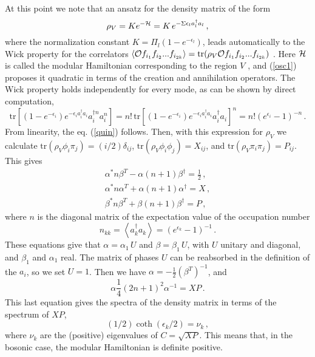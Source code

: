\documentclass[11pt]{article}
\begin{document}
At this point we note that an ansatz for the density matrix of the form \cite{peschel,chung}
\begin{equation}
\rho _{V}=K e^{-{\cal H}}=K\,e^{-\Sigma \epsilon _{l}a_{l}^{\dagger }a_{l}}\,,  \label{osc1}
\end{equation}
where  the normalization constant $K=\Pi_l (1-e^{-\epsilon_l} )$, leads automatically to the Wick property for the correlators  
$\left<{\cal O} f_{i_1} f_{i_2}...f_{i_{2k}}\right>=\textrm{tr}(\rho _{V}  {\cal O} f_{i_1} f_{i_2}...f_{i_{2k}})$ \cite{wick}. Here ${\cal H}$ is called the modular Hamiltonian corresponding to the region $V$ \cite{haag}, and (\ref{osc1}) proposes it quadratic in terms of the creation and annihilation operators. 
 The Wick property holds independently for every mode, as can be shown by direct computation,
\begin{equation}
\textrm{tr} \left[(1-e^{-\epsilon_i} ) e^{-\epsilon_i a^\dagger_i a_i}      a_i^{\dagger n}   a_i^n   \right]=n!\,\textrm{tr}\left[(1-e^{-\epsilon_i} ) e^{-\epsilon_i a^\dagger_i a_i}  a_i^{\dagger} a_i   \right]^n= n! (e^{\epsilon_i} -1)^{-n}\,.
\end{equation}
From linearity, the eq. (\ref{quin}) follows.    
Then, with this expression for $\rho_V$ we calculate $\textrm{tr} (\rho_V \phi_i\pi_j)=(i/2)\delta_{ij}$, $\textrm{tr} (\rho_V \phi_i\phi_j)=X_{ij}$, and $\textrm{tr} (\rho_V \pi_i\pi_j)= P_{ij}$. This gives  
\begin{eqnarray}
\alpha^* n \beta^T -\alpha (n+1)\beta^\dagger=\frac{1}{2}\,,\\
\alpha^* n \alpha^T+ \alpha (n+1) \alpha^\dagger=X \,,\\
\beta^* n \beta^T+ \beta (n+1) \beta^\dagger=P\,,
\end{eqnarray}
where $n$ is the diagonal matrix of the expectation value of the occupation number 
\begin{equation}
n_{kk}=\left<a^\dagger_k a_k\right>=(e^{\epsilon_k}-1)^{-1}\,.
\end{equation} 
These equations give that  
$\alpha =\alpha_1 \, U $ and $
\beta = \beta_1 \, U $,
with $U$ unitary and diagonal, and $\beta_1$ and $\alpha_1$ real. The matrix of phases $U$ can be reabsorbed in the definition of the $a_i$, so we set $U=1$. Then we have 
 $
\alpha=-\frac{1}{2} (\beta^T)^{-1}$, and 
\begin{equation}
\alpha \frac{1}{4}(2n+1)^2 \alpha^{-1}=X P\,.
\end{equation}
This last equation gives the spectra of the density matrix in terms of the spectrum of $X P$,  
\begin{equation}
(1/2)\coth(\epsilon_k/2)=\nu_k \,,
\end{equation}
 where $\nu_k$ are the (positive) eigenvalues of $C=\sqrt{XP}$. This means that, in the bosonic case, the modular Hamiltonian is definite positive.
 
\end{document}
